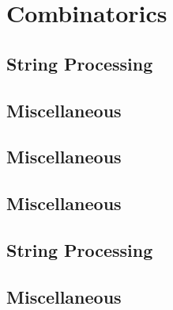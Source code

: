 \section{Combinatorics}
\subsection{String Processing}
\raggedbottom
\vspace{-.7\baselineskip}\hrulefill
\vspace{0.1\baselineskip}\subsection{Miscellaneous}
\raggedbottom
\vspace{-.7\baselineskip}\hrulefill
\vspace{0.1\baselineskip}\subsection{Miscellaneous}
\raggedbottom
\vspace{-.7\baselineskip}\hrulefill
\vspace{0.1\baselineskip}\subsection{Miscellaneous}
\raggedbottom
\vspace{-.7\baselineskip}\hrulefill
\vspace{0.1\baselineskip}\subsection{String Processing}
\raggedbottom
\vspace{-.7\baselineskip}\hrulefill
\vspace{0.1\baselineskip}\subsection{Miscellaneous}
\raggedbottom
